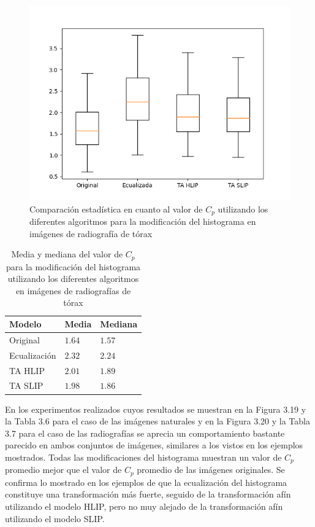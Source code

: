 \begin{figure}
	\begin{center}
		\includegraphics[width=10.0 cm]{images/graphics/torax/affine_transform/eq_all.png}
		\caption{Comparaci\'on estad\'istica en cuanto al valor de $C_p$ utilizando los diferentes algoritmos para la modificaci\'on del histograma en im\'agenes de radiograf\'ia de t\'orax}
	\end{center}
\end{figure}

\begin{table}
	\begin{center}
		\begin{tabular}{|l|l|l|}
			\hline 
			Modelo & Media & Mediana\\
			\hline
			Original & $1.64$ & $1.57$\\
			\hline
			Ecualizaci\'on & $2.32$ & $2.24$\\
			\hline
			TA HLIP & $2.01$ & $1.89$\\
			\hline
			TA SLIP & $1.98$ & $1.86$\\
			\hline
		\end{tabular}
		\caption{Media y mediana del valor de $C_p$ para la modificaci\'on del histograma utilizando los diferentes algoritmos en im\'agenes de radiograf\'ias de t\'orax}
	\end{center}
\end{table}

En los experimentos realizados cuyos resultados se muestran en la Figura 3.19 y la Tabla 3.6 para el caso de las im\'agenes naturales y en la Figura 3.20 y la Tabla 3.7 para el caso de las radiograf\'ias se aprecia un comportamiento bastante parecido en ambos conjuntos de im\'agenes, similares a los vistos en los ejemplos mostrados. Todas las modificaciones del histograma muestran un valor de $C_p$ promedio mejor que el valor de $C_p$ promedio de las im\'agenes originales. Se confirma lo mostrado en los ejemplos de que la ecualizaci\'on del histograma constituye una transformaci\'on m\'as fuerte, seguido de la transformaci\'on af\'in utilizando el modelo HLIP, pero no muy alejado de la transformaci\'on af\'in  utilizando el modelo SLIP.

